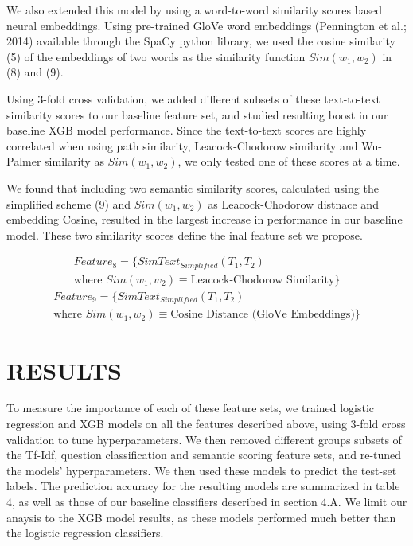 \documentclass[letterpaper, 10 pt, conference]{ieeeconf}  %
\begin{document}
We also extended this model by using a word-to-word similarity scores based neural embeddings. Using pre-trained GloVe word embeddings (Pennington et al.; 2014) available through the SpaCy python library, we used the cosine similarity (5) of the embeddings of two words as the similarity function $Sim(w_1,w_2)$ in (8) and (9). 

Using 3-fold cross validation, we added different subsets of these text-to-text similarity scores to our baseline feature set, and studied resulting boost in our baseline XGB model performance. Since the text-to-text scores are highly correlated when using path similarity, Leacock-Chodorow similarity and Wu-Palmer similarity as $Sim(w_1, w_2)$, we only tested one of these scores at a time. 

We found that including two semantic similarity scores, calculated using the simplified scheme (9) and $Sim(w_1, w_2)$ as  Leacock-Chodorow distnace and embedding Cosine, resulted in the largest increase in performance in our baseline model. These two similarity scores define the inal feature set we propose. 

\begin{gather*} \tag{10}
Feature_{8} = \{SimText_{Simplified}(T_1, T_2) \\ \text{where } Sim(w_1, w_2) \equiv \text{Leacock-Chodorow Similarity}\}
\end{gather*}
\begin{gather*} \tag{11}
Feature_{9} = \{SimText_{Simplified}(T_1, T_2) \\ \text{where } Sim(w_1, w_2) \equiv \text{Cosine Distance (GloVe Embeddings)}\}
\end{gather*}


\section{RESULTS}

To measure the importance of each of these feature sets, we trained logistic regression and XGB models on all the features described above, using 3-fold cross validation to tune hyperparameters. We then removed different groups subsets of the Tf-Idf, question classification and semantic scoring feature sets, and re-tuned the models’ hyperparameters. We then used these models to predict the test-set labels. The prediction accuracy for the resulting models are summarized in table 4, as well as those of our baseline classifiers described in section 4.A. We limit our anaysis to the XGB model results, as these models performed much better than the logistic regression classifiers. 
\end{document}
